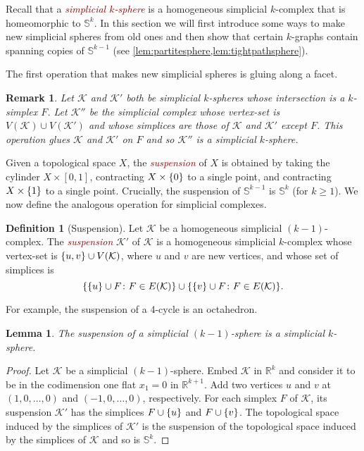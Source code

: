 \documentclass[12pt,reqno]{amsart}
\theoremstyle{plain}
\newtheorem{lemma}[theorem]{Lemma}
\newtheorem{remark}[theorem]{Remark}
\theoremstyle{definition}
\newtheorem{definition}[theorem]{Definition}
\numberwithin{equation}{section}
\DeclarePairedDelimiter{\set}{\{}{\}}
\renewcommand{\geq}{\geqslant}
\newcommand{\defn}[1]{\textcolor{Maroon}{\emph{#1}}}
\newcommand{\bR}{\mathbb{R}}
\newcommand{\bS}{\mathbb{S}}
\newcommand{\cK}{\mathcal{K}}
\begin{document}
	Recall that a \defn{simplicial $k$-sphere} is a homogeneous simplicial $k$-complex that is homeomorphic to $\bS^k$. In this section we will first introduce some ways to make new simplicial spheres from old ones and then show that certain $k$-graphs contain spanning copies of $\bS^{k - 1}$ (see \cref{lem:partitesphere,lem:tightpathsphere}).
	
	The first operation that makes new simplicial spheres is gluing along a facet.
	
	\begin{remark}\label{rmk:gluecommonface}
		Let $\cK$ and $\cK'$ both be simplicial $k$-spheres whose intersection is a $k$-simplex $F$. Let $\cK''$ be the simplicial complex whose vertex-set is $V(\cK) \cup V(\cK')$ and whose simplices are those of $\cK$ and $\cK'$ except $F$. This operation glues $\cK$ and $\cK'$ on $F$ and so $\cK''$ is a simplicial $k$-sphere.
	\end{remark}
	
	Given a topological space $X$, the \defn{suspension} of $X$ is obtained by taking the cylinder $X \times [0, 1]$, contracting $X \times \set{0}$ to a single point, and contracting $X \times \set{1}$ to a single point. Crucially, the suspension of $\bS^{k - 1}$ is $\bS^k$ (for $k \geq 1$). We now define the analogous operation for simplicial complexes.
	
	\begin{definition}[Suspension]
		Let $\cK$ be a homogeneous simplicial $(k - 1)$-complex. The \defn{suspension} $\cK'$ of $\cK$ is a homogeneous simplicial $k$-complex whose vertex-set is $\set{u, v} \cup V(\cK)$, where $u$ and $v$ are new vertices, and whose set of simplices is
		\begin{equation*}
			\set{\set{u} \cup F \colon F \in E(\cK)} \cup \set{\set{v} \cup F \colon F \in E(\cK)}.
		\end{equation*}
	\end{definition}
	
	For example, the suspension of a 4-cycle is an octahedron.
	
	\begin{lemma}\label{lem:suspensions}
		The suspension of a simplicial $(k - 1)$-sphere is a simplicial $k$-sphere.
	\end{lemma}
	
	\begin{proof}
		Let $\cK$ be a simplicial $(k - 1)$-sphere. Embed $\cK$ in $\bR^k$ and consider it to be in the codimension one flat $x_1 = 0$ in $\bR^{k + 1}$. Add two vertices $u$ and $v$ at $(1, 0, \dotsc, 0)$ and $(-1, 0, \dotsc, 0)$, respectively. For each simplex $F$ of $\cK$, its suspension $\cK'$ has the simplices $F \cup \set{u}$ and $F \cup \set{v}$. The topological space induced by the simplices of $\cK'$ is the suspension of the topological space induced by the simplices of $\cK$ and so is $\bS^k$.
	\end{proof}
	
\end{document}
